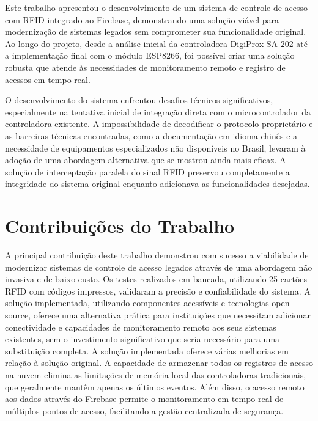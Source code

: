 
\label{Cap:Conclusao}

Este trabalho apresentou o desenvolvimento de um sistema de controle de acesso com RFID integrado ao Firebase, demonstrando uma solução viável para modernização de sistemas legados sem comprometer sua funcionalidade original. Ao longo do projeto, desde a análise inicial da controladora DigiProx SA-202 até a implementação final com o módulo ESP8266, foi possível criar uma solução robusta que atende às necessidades de monitoramento remoto e registro de acessos em tempo real.

O desenvolvimento do sistema enfrentou desafios técnicos significativos, especialmente na tentativa inicial de integração direta com o microcontrolador da controladora existente. A impossibilidade de decodificar o protocolo proprietário e as barreiras técnicas encontradas, como a documentação em idioma chinês e a necessidade de equipamentos especializados não disponíveis no Brasil, levaram à adoção de uma abordagem alternativa que se mostrou ainda mais eficaz. A solução de interceptação paralela do sinal RFID preservou completamente a integridade do sistema original enquanto adicionava as funcionalidades desejadas.

\section{Contribuições do Trabalho}

A principal contribuição deste trabalho demonstrou com sucesso a viabilidade de modernizar sistemas de controle de acesso legados através de uma abordagem não invasiva e de baixo custo. Os testes realizados em bancada, utilizando 25 cartões RFID com códigos impressos, validaram a precisão e confiabilidade do sistema. A solução implementada, utilizando componentes acessíveis e tecnologias open source, oferece uma alternativa prática para instituições que necessitam adicionar conectividade e capacidades de monitoramento remoto aos seus sistemas existentes, sem o investimento significativo que seria necessário para uma substituição completa. A solução implementada oferece várias melhorias em relação à solução original. A capacidade de armazenar todos os registros de acesso na nuvem elimina as limitações de memória local das controladoras tradicionais, que geralmente mantêm apenas os últimos eventos. Além disso, o acesso remoto aos dados através do Firebase permite o monitoramento em tempo real de múltiplos pontos de acesso, facilitando a gestão centralizada de segurança.

